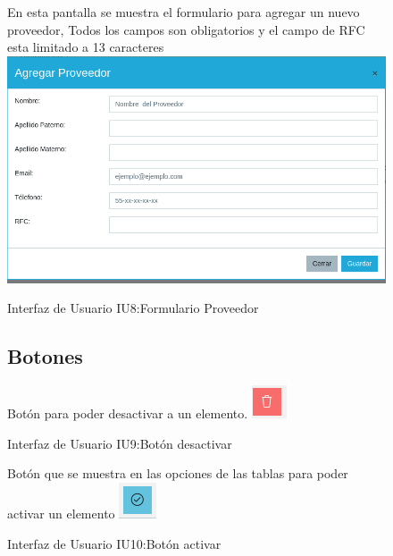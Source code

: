 \begin{figure}[htbp!]
	\begin{center} 
	En esta pantalla se muestra el formulario para agregar un nuevo proveedor,
	Todos los campos son obligatorios y el campo  de RFC esta limitado a 13 caracteres
\includegraphics[width=\textwidth]{Pantallas/ProveedorFormulario}
		\caption{Interfaz de Usuario IU8:Formulario Proveedor}
	\end{center}
\end{figure}


\begin{figure}[htbp!]
	\begin{center}
	 \subsection{Botones}
	Botón para poder desactivar a un elemento.
\includegraphics[scale=1]{Pantallas/bottonDesactivar}
		\caption{Interfaz de Usuario IU9:Botón desactivar}
	\end{center}
\end{figure}



\begin{figure}[htbp!]
	\begin{center}
	Botón que se muestra en las opciones de las tablas para poder activar un elemento
\includegraphics[scale=1]{Pantallas/bottonActivar}
		\caption{Interfaz de Usuario IU10:Botón activar}
	\end{center}
\end{figure}



